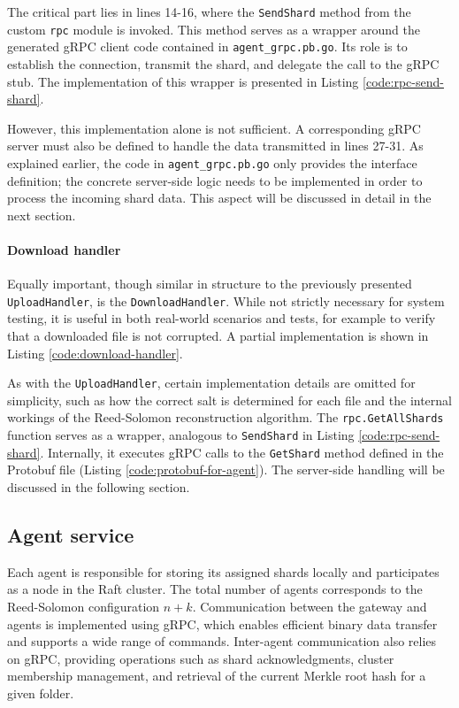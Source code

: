 The critical part lies in lines 14-16, where the \texttt{SendShard} method from the custom \texttt{rpc} module is invoked. This method serves as a wrapper around the generated gRPC client code contained in \texttt{agent\_grpc.pb.go}. Its role is to establish the connection, transmit the shard, and delegate the call to the gRPC stub. The implementation of this wrapper is presented in Listing \ref{code:rpc-send-shard}.

However, this implementation alone is not sufficient. A corresponding gRPC server must also be defined to handle the data transmitted in lines 27-31. As explained earlier, the code in \texttt{agent\_grpc.pb.go} only provides the interface definition; the concrete server-side logic needs to be implemented in order to process the incoming shard data. This aspect will be discussed in detail in the next section.

\paragraph{Download handler}

Equally important, though similar in structure to the previously presented \texttt{UploadHandler}, is the \texttt{DownloadHandler}. While not strictly necessary for system testing, it is useful in both real-world scenarios and tests, for example to verify that a downloaded file is not corrupted. A partial implementation is shown in Listing \ref{code:download-handler}.

As with the \texttt{UploadHandler}, certain implementation details are omitted for simplicity, such as how the correct salt is determined for each file and the internal workings of the Reed-Solomon reconstruction algorithm. The \texttt{rpc.GetAllShards} function serves as a wrapper, analogous to \texttt{SendShard} in Listing \ref{code:rpc-send-shard}. Internally, it executes gRPC calls to the \texttt{GetShard} method defined in the Protobuf file (Listing \ref{code:protobuf-for-agent}). The server-side handling will be discussed in the following section.

\newpage

\subsection{Agent service}

Each agent is responsible for storing its assigned shards locally and participates as a node in the Raft cluster. The total number of agents corresponds to the Reed-Solomon configuration $n+k$. Communication between the gateway and agents is implemented using gRPC, which enables efficient binary data transfer and supports a wide range of commands. Inter-agent communication also relies on gRPC, providing operations such as shard acknowledgments, cluster membership management, and retrieval of the current Merkle root hash for a given folder.

